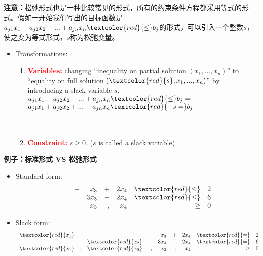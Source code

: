 \textbf{注意：}松弛形式也是一种比较常见的形式，所有的约束条件方程都采用等式的形式。假如一开始我们写出的目标函数是$a_{j1}x_1 + a_{j2}x_2 + ... + a_{jn}x_n  \textcolor{red}{  \leq } b_j$的形式，可以引入一个整数$s$，使之变为等式形式，$s$称为松弛变量。

\begin{itemize}
\item
Transformations:
\begin{enumerate}
 \item
\textcolor{red}{\bf Variables:} changing ``inequality on partial solution $(x_1,...,x_n)$'' to ``equality on full solution $(\textcolor{red}{s}, x_1, ..., x_n)$'' by introducing a slack variable $s$. \\
$a_{j1}x_1 + a_{j2}x_2 + ... + a_{jn}x_n  \textcolor{red}{  \leq } b_j \Rightarrow $\\
$a_{j1}x_1 + a_{j2}x_2 + ... + a_{jn}x_n  \textcolor{red}{ + s = } b_j $\\
\ \\
\ \\
\item
\textcolor{red}{\bf Constraint:}  $s \geq 0 $.  ($s$ is called a slack variable)
\end{enumerate}
\end{itemize}

\textbf{例子：标准形式 VS 松弛形式}
\begin{itemize}
\item
Standard form:
\[
\begin{array}{rrrrrrrrrrrrl}
            & &             &-&x_3     &+&2x_4  & \textcolor{red}{\leq} & 2 &  \\
             & &           & & 3x_3  &-&2x_4  &  \textcolor{red}{\leq} & 6 &  \\
        & &  & & x_{3}&,&x_{4} &  \geq  & 0 & \\
     \end{array} \nonumber
\]

\item
Slack form:
\[
\begin{array}{rrrrrrrrrrrrl}
     \textcolor{red}{  x_1 }& &             &-& x_3     &+&2x_4  & \textcolor{red}{=} & 2 &  \\
             & & \textcolor{red}{  x_{2} }   &+& 3x_3  &-&2x_4  &\textcolor{red}{=}& 6 &  \\
      \textcolor{red}{ x_1} &,& \textcolor{red}{ x_2} &,& x_{3}&,&x_{4} &  \geq  & 0 & \\
     \end{array} \nonumber
\]
\end{itemize}

